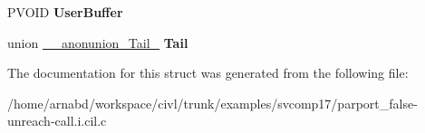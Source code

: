 \begin{DoxyCompactItemize}
\item 
\hypertarget{struct__IRP_a38778e19bf55bb207ac1601a63697887}{}P\+V\+O\+I\+D {\bfseries User\+Buffer}\label{struct__IRP_a38778e19bf55bb207ac1601a63697887}

\item 
\hypertarget{struct__IRP_a90fb1d9ffa7f9c8ea569d54703de5edf}{}union \hyperlink{union____anonunion__Tail__47}{\+\_\+\+\_\+anonunion\+\_\+\+Tail\+\_} {\bfseries Tail}\label{struct__IRP_a90fb1d9ffa7f9c8ea569d54703de5edf}

\end{DoxyCompactItemize}


The documentation for this struct was generated from the following file\+:\begin{DoxyCompactItemize}
\item 
/home/arnabd/workspace/civl/trunk/examples/svcomp17/parport\+\_\+false-\/unreach-\/call.\+i.\+cil.\+c\end{DoxyCompactItemize}
